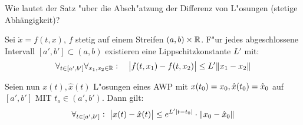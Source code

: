 \documentclass[9pt]{article}
\newcommand{\R}[1]{%
	\ifthenelse{\equal{#1}{}}
		{\mathbb{R}}
		{\mathbb{R}^{#1}}}%
\newenvironment{field}{}{\newpage}
\newif\ifnote
\newenvironment{note}{\notetrue}{\notefalse}
\newcommand{\localtag}{}
\newcommand{\globaltag}{}
\newcommand{\uuid}{}
\newcommand{\tags}[1]{
    \ifnote 
        \renewcommand{\localtag}{#1}
    \else
        \renewcommand{\globaltag}{#1}
    \fi 
    }
\newcommand{\xplain}[1]{\renewcommand{\uuid}{#1}}
\begin{document}
\begin{note}
	\xplain{UUID}
	\tags{satz, 3.6}
	
	\begin{field}  %
		Wie lautet der Satz "uber die Absch"atzung der Differenz von L"osungen (stetige Abhängigkeit)?
	\end{field}
	
	\begin{field}  %
		Sei $\dot{x}=f(t,x)$, $f$ stetig auf einem Streifen $(a,b)\times \R{}$. F"ur jedes abgeschlossene Intervall $[a',b'] \subset (a,b)$ existieren eine Lippschitzkonstante $L'$ mit:
		\begin{equation*}
			\forall_{t \in [a', b']} \forall_{x_1, x_2 \in \R{}}: \quad
			\abs{f(t,x_1) - f(t,x_2)} \leq L'\norm{x_1 - x_2}
		\end{equation*}
		
		Seien nun $x(t), \hat{x}(t)$ L"osungen eines AWP mit $x(t_0)=x_0, \\  \hat{x}(t_0) = \hat{x}_0$
		auf $[a',b']$ MIT $t_o \in (a',b')$. Dann gilt:
		\begin{equation*}
			\forall_{t \in [a', b']}: \ \abs{x(t) - \hat{x}(t)} \leq e^{L'\abs{t-t_0}} \cdot \norm{x_0-\hat{x}_0}
		\end{equation*}
	\end{field}
\end{note}
\end{document}
